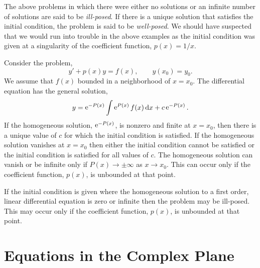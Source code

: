 The above problems in which there were either no solutions or an infinite
number of solutions are said to be \textit{ill-posed}.  
If there is a unique solution that satisfies the initial condition, 
the problem is said to be \textit{well-posed}.  We should have suspected that
we would run into trouble in the above examples as the initial condition 
was given at a singularity of the coefficient function, $p(x) = 1/x$.

Consider the problem,
\[
y' + p(x) y = f(x), \qquad y(x_0) = y_0.
\]
We assume that $f(x)$ bounded in a neighborhood of $x = x_0$.
The differential equation has the general solution,
\[ 
y = \mathop{\mathrm{e}}\nolimits^{-P(x)} \int \mathop{\mathrm{e}}\nolimits^{P(x)}f(x)\,\mathrm{d} x + c \mathop{\mathrm{e}}\nolimits^{-P(x)}.
\]
If the homogeneous solution, $\mathop{\mathrm{e}}\nolimits^{-P(x)}$, is nonzero and finite at $x = x_0$, 
then there is a unique value of $c$ for which the initial condition is 
satisfied.   If the homogeneous solution vanishes at $x = x_0$ then either
the initial condition cannot be satisfied or the initial condition is
satisfied for all values of $c$.   The homogeneous solution can vanish
or be infinite only if $P(x) \to \pm \infty$ as $x \to x_0$.   This can
occur only if the coefficient function, $p(x)$, is unbounded at that point.













\begin{Result}
  If the initial condition is given where the homogeneous solution to a first 
  order, linear differential equation is zero or infinite then the problem 
  may be ill-posed.  This may occur only if the coefficient function,
  $p(x)$, is unbounded at that point.
\end{Result}









\section{Equations in the Complex Plane}




